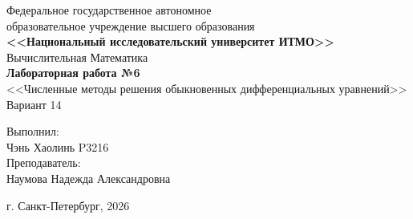 \begin{titlepage}
    \centering
    Федеральное государственное автономное \\
    образовательное учреждение высшего образования \\
    \textbf{<<Национальный исследовательский университет ИТМО>>} \\

    \vfill
    Вычислительная Математика \\
    \vspace{0.5\baselineskip}
    \textbf{Лабораторная работа №6} \\
    \vspace{0.5\baselineskip}
    <<Численные методы решения обыкновенных дифференциальных уравнений>> \\
    \vspace{0.5\baselineskip}
    Вариант 14 \\

    \vfill

    \flushright
    Выполнил:\\
    Чэнь Хаолинь P3216\\
    Преподаватель:\\
    Наумова Надежда Александровна\\

    \vspace{4\baselineskip}

    \centering
    г. Санкт-Петербург, 2026

\end{titlepage}
